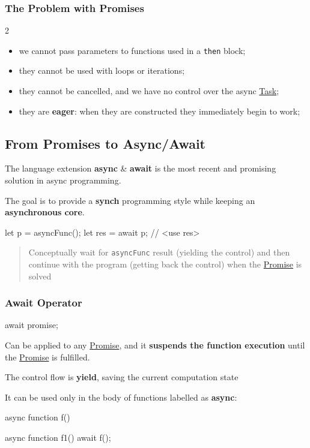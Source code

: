 \subsubsection{The Problem with Promises}\label{sub:rs_the_problem_with_promises} %
\begin{multicols}{2}
    \begin{itemize}
        \item we cannot pass parameters to functions used in a \texttt{then} block;
        \item they cannot be used with loops or iterations;
        \item they cannot be cancelled, and we have no control over the async \hyperref[def:task]{Task};
        \item they are \textbf{eager}: when they are constructed they immediately begin to work;
    \end{itemize}
\end{multicols}
%
\subsection{From Promises to Async/Await}\label{sub:rs_from_promises_to_async_await} %
The language extension \textbf{async} \& \textbf{await} is the most recent and promising solution in async programming.
\begin{note}[Idea]
    The goal is to provide a \textbf{synch} programming style while keeping an \textbf{asynchronous core}.
\end{note}
\begin{codeblock}[js]{}
    let p = asyncFunc();
    let res = await p;
    // <use res>
\end{codeblock}
\begin{quote}
    Conceptually wait for \texttt{asyncFunc} result (yielding the control) and then continue with the program (getting back the control) when the \hyperref[def:promises]{Promise} is solved
\end{quote}
%
\subsubsection{Await Operator}\label{sub:rs_await_operator} %
\begin{codeblock}[js]{}
    await promise;
\end{codeblock}
Can be applied to any \hyperref[def:promises]{Promise}, and it \textbf{suspends the function execution} until the \hyperref[def:promises]{Promise} is fulfilled.
\begin{critical}
    The control flow is \textbf{yield}, saving the current computation state
\end{critical}
It can be used only in the body of functions labelled as \textbf{async}:
\begin{codeblock}[js]{}
    async function f() {}

    async function f1() {
        await f();
    }
\end{codeblock}
%
